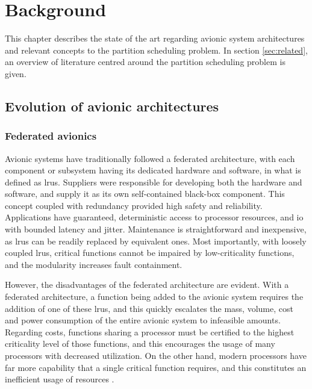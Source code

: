 \documentclass[main.tex]{subfiles}
\begin{document}
\chapter{Background}
\label{sec:background}

This chapter describes the state of the art regarding avionic system architectures and relevant concepts to the partition scheduling problem.
In section \ref{sec:related}, an overview of literature centred around the partition scheduling problem is given.


\section{Evolution of avionic architectures}

\subsection{Federated avionics}

Avionic systems have traditionally followed a federated architecture, with each component or subsystem having its dedicated hardware and software, in what is defined as \glspl{lru}.
Suppliers were responsible for developing both the hardware and software, and supply it as its own self-contained black-box component.
This  concept coupled with redundancy provided high safety and reliability.
Applications have guaranteed, deterministic access to processor resources, and \gls{io} with bounded latency and jitter.
Maintenance is straightforward and inexpensive, as \glspl{lru} can be readily replaced by equivalent ones.
Most importantly, with loosely coupled \glspl{lru}, critical functions cannot be impaired by low-criticality functions, and the modularity increases fault containment.

However, the disadvantages of the federated architecture are evident.
With a federated architecture, a function being added to the avionic system requires the addition of one of these \glspl{lru}, and this quickly escalates the mass, volume, cost and power consumption of the entire avionic system to infeasible amounts.
Regarding costs, functions sharing a processor must be certified to the highest criticality level of those functions, and this encourages the usage of many processors with decreased utilization.
On the other hand, modern processors have far more capability that a single critical function requires, and this constitutes an inefficient usage of resources \cite{mairaj2015preferred}.
\end{document}
